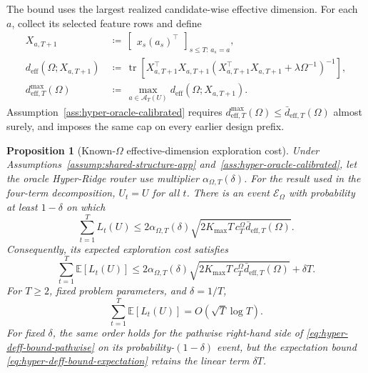 \documentclass{article} %
\newtheorem{proposition}[theorem]{Proposition}
\begin{document}
The bound uses the largest realized candidate-wise effective dimension. For
each \(a\), collect its selected feature rows and define
\begin{align}
X_{a,T+1}
&\,\coloneqq\,
\begin{bmatrix}
x_s(a_s)^\top
\end{bmatrix}_{s\le T:\,a_s=a},
\label{eq:hyper-oracle-XaT}
\\
d_{\mathrm{eff}}(\Omega;X_{a,T+1})
&\,\coloneqq\,
\operatorname{tr}
\!\left[
X_{a,T+1}^{\top}X_{a,T+1}
\left(
X_{a,T+1}^{\top}X_{a,T+1}+\lambda\Omega^{-1}
\right)^{-1}
\right],
\label{eq:hyper-oracle-deff-a}
\\
d_{\mathrm{eff},T}^{\max}(\Omega)
&\,\coloneqq\,
\max_{a\in\mathcal A_T(U)}
d_{\mathrm{eff}}(\Omega;X_{a,T+1}).
\label{eq:hyper-oracle-deff-max}
\end{align}
Assumption~\ref{ass:hyper-oracle-calibrated} requires
$d_{\mathrm{eff},T}^{\max}(\Omega)\le
\bar d_{\mathrm{eff},T}(\Omega)$ almost surely, and imposes the same cap on
every earlier design prefix.

\begin{proposition}[Known-\(\Omega\) effective-dimension exploration cost]
\label{prop:deff-bound-app}
Under Assumptions~\ref{assump:shared-structure-app}
and~\ref{ass:hyper-oracle-calibrated}, let the oracle Hyper-Ridge router use
multiplier $\alpha_{\Omega,T}(\delta)$. For the result used in the four-term
decomposition, \(U_t=U\) for all \(t\). There is an event
$\mathcal E_\Omega$ with probability at least $1-\delta$ on which
\begin{equation}
\label{eq:hyper-deff-bound-pathwise}
\sum_{t=1}^{T}L_t(U)
\le
2\alpha_{\Omega,T}(\delta)
\sqrt{
2K_{\max}T\,c_T^\Omega
\bar d_{\mathrm{eff},T}(\Omega)
}.
\end{equation}
Consequently, its expected exploration cost satisfies
\begin{equation}
\label{eq:hyper-deff-bound-expectation}
\sum_{t=1}^{T}\mathbb{E}[L_t(U)]
\le
2\alpha_{\Omega,T}(\delta)
\sqrt{
2K_{\max}T\,c_T^\Omega
\bar d_{\mathrm{eff},T}(\Omega)
}
+
\delta T .
\end{equation}
For \(T\ge2\), fixed problem parameters, and $\delta=1/T$,
\begin{equation}
\label{eq:hyper-deff-bound-rate}
\sum_{t=1}^{T}\mathbb{E}[L_t(U)]
=
O\!\left(\sqrt{T}\log T\right).
\end{equation}
For fixed $\delta$, the same order holds for the pathwise right-hand side of
\eqref{eq:hyper-deff-bound-pathwise} on its probability-\((1-\delta)\) event,
but the expectation bound \eqref{eq:hyper-deff-bound-expectation} retains the
linear term $\delta T$.
\end{proposition}
\end{document}

